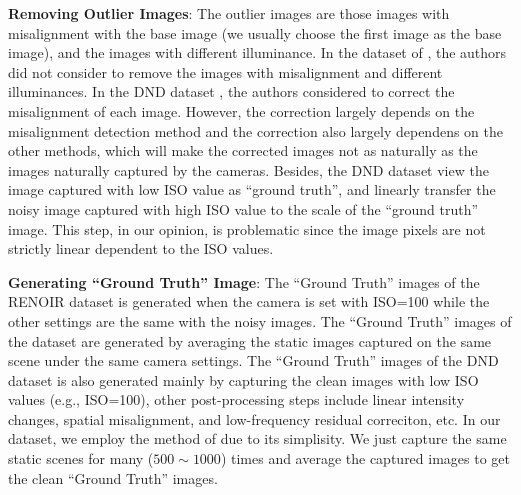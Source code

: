 \textbf{Removing Outlier Images}: The outlier images are those images with misalignment with the base image (we usually choose the first image as the base image), and the images with different illuminance. In the dataset of \cite{crosschannel2016}, the authors did not consider to remove the images with misalignment and different illuminances. In the DND dataset \cite{dnd2017}, the authors considered to correct the misalignment of each image. However, the correction largely depends on the misalignment detection method and the correction also largely dependens on the other methods, which will make the corrected images not as naturally as the images naturally captured by the cameras. Besides, the DND dataset \cite{dnd2017} view the image captured with low ISO value as ``ground truth'', and linearly transfer the noisy image captured with high ISO value to the scale of the ``ground truth'' image. This step, in our opinion, is problematic since the image pixels are not strictly linear dependent to the ISO values. 
 
\textbf{Generating ``Ground Truth'' Image}: The ``Ground Truth'' images of the RENOIR dataset \cite{RENOIR2014} is generated when the camera is set with ISO=100 while the other settings are the same with the noisy images. The ``Ground Truth'' images of the dataset \cite{crosschannel2016} are generated by averaging the static images captured on the same scene under the same camera settings. The ``Ground Truth'' images of the DND dataset \cite{dnd2017} is also generated mainly by capturing the clean images with low ISO values (e.g., ISO=100), other post-processing steps include linear intensity changes, spatial misalignment, and low-frequency residual correciton, etc. In our dataset, we employ the method of \cite{crosschannel2016} due to its simplisity. We just capture the same static scenes for many ($500\sim1000$) times and average the captured images to get the clean ``Ground Truth'' images. 

